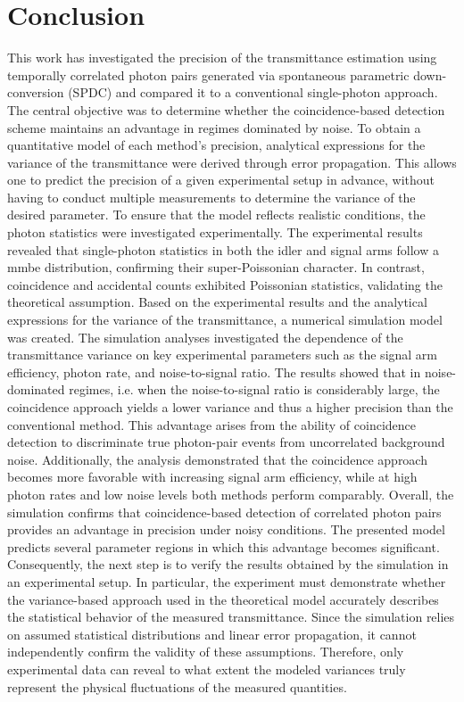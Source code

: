 \section{Conclusion}
This work has investigated the precision of the transmittance estimation using temporally correlated photon pairs generated via spontaneous parametric down-conversion (SPDC) and compared it to a conventional single-photon approach. The central objective was to determine whether the coincidence-based detection scheme maintains an advantage in regimes dominated by noise. \newline
To obtain a quantitative model of each method’s precision, analytical expressions for the variance of the transmittance were derived through error propagation. This allows one to predict the precision of a given experimental setup in advance, without having to conduct multiple measurements to determine the variance of the desired parameter. To ensure that the model reflects realistic conditions, the photon statistics were investigated experimentally. \newline
The experimental results revealed that single-photon statistics in both the idler and signal arms follow a \acrshort{mmbe} distribution, confirming their super-Poissonian character. In contrast, coincidence and accidental counts exhibited Poissonian statistics, validating the theoretical assumption. Based on the experimental results and the analytical expressions for the variance of the transmittance, a numerical simulation model was created. \newline
The simulation analyses investigated the dependence of the transmittance variance on key experimental parameters such as the signal arm efficiency, photon rate, and noise-to-signal ratio. The results showed that in noise-dominated regimes, i.e. when the noise-to-signal ratio is considerably large, the coincidence approach yields a lower variance and thus a higher precision than the conventional method. This advantage arises from the ability of coincidence detection to discriminate true photon-pair events from uncorrelated background noise. Additionally, the analysis demonstrated that the coincidence approach becomes more favorable with increasing signal arm efficiency, while at high photon rates and low noise levels both methods perform comparably. \newline
Overall, the simulation confirms that coincidence-based detection of correlated photon pairs provides an advantage in precision under noisy conditions. The presented model predicts several parameter regions in which this advantage becomes significant. \newline Consequently, the next step is to verify the results obtained by the simulation in an experimental setup. In particular, the experiment must demonstrate whether the variance-based approach used in the theoretical model accurately describes the statistical behavior of the measured transmittance. Since the simulation relies on assumed statistical distributions and linear error propagation, it cannot independently confirm the validity of these assumptions. Therefore, only experimental data can reveal to what extent the modeled variances truly represent the physical fluctuations of the measured quantities. \newline
